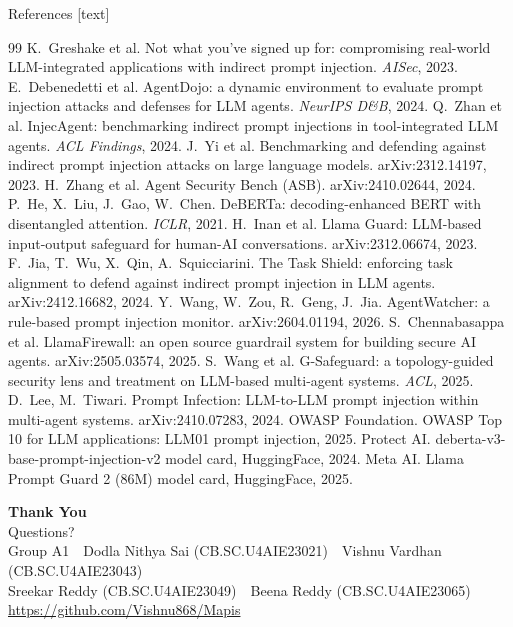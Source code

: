 \documentclass[aspectratio=169,10pt]{beamer}
\newcommand{\GroupName}{Group A1}
\newcommand{\MemberA}{Dodla Nithya Sai (CB.SC.U4AIE23021)}
\newcommand{\MemberB}{Vishnu Vardhan (CB.SC.U4AIE23043)}
\newcommand{\MemberC}{Sreekar Reddy (CB.SC.U4AIE23049)}
\newcommand{\MemberD}{Beena Reddy (CB.SC.U4AIE23065)}
\begin{document}
\begin{frame}{References}
    \scriptsize
    [text]
    \tiny
    \begin{thebibliography}{99}
       K.~Greshake et al. Not what you've signed up for: compromising real-world LLM-integrated applications with indirect prompt injection. \emph{AISec}, 2023.
       E.~Debenedetti et al. AgentDojo: a dynamic environment to evaluate prompt injection attacks and defenses for LLM agents. \emph{NeurIPS D\&B}, 2024.
       Q.~Zhan et al. InjecAgent: benchmarking indirect prompt injections in tool-integrated LLM agents. \emph{ACL Findings}, 2024.
       J.~Yi et al. Benchmarking and defending against indirect prompt injection attacks on large language models. arXiv:2312.14197, 2023.
       H.~Zhang et al. Agent Security Bench (ASB). arXiv:2410.02644, 2024.
       P.~He, X.~Liu, J.~Gao, W.~Chen. DeBERTa: decoding-enhanced BERT with disentangled attention. \emph{ICLR}, 2021.
       H.~Inan et al. Llama Guard: LLM-based input-output safeguard for human-AI conversations. arXiv:2312.06674, 2023.
       F.~Jia, T.~Wu, X.~Qin, A.~Squicciarini. The Task Shield: enforcing task alignment to defend against indirect prompt injection in LLM agents. arXiv:2412.16682, 2024.
       Y.~Wang, W.~Zou, R.~Geng, J.~Jia. AgentWatcher: a rule-based prompt injection monitor. arXiv:2604.01194, 2026.
       S.~Chennabasappa et al. LlamaFirewall: an open source guardrail system for building secure AI agents. arXiv:2505.03574, 2025.
       S.~Wang et al. G-Safeguard: a topology-guided security lens and treatment on LLM-based multi-agent systems. \emph{ACL}, 2025.
       D.~Lee, M.~Tiwari. Prompt Infection: LLM-to-LLM prompt injection within multi-agent systems. arXiv:2410.07283, 2024.
       OWASP Foundation. OWASP Top 10 for LLM applications: LLM01 prompt injection, 2025.
       Protect AI. deberta-v3-base-prompt-injection-v2 model card, HuggingFace, 2024.
       Meta AI. Llama Prompt Guard 2 (86M) model card, HuggingFace, 2025.
    \end{thebibliography}
\end{frame}

\begin{frame}[plain]
  \centering
  \vfill
  {\fontsize{54}{60}\selectfont\bfseries\color{red!60!black} Thank You}\\[8mm]
  {\Large Questions?}\\[10mm]
  {\small \GroupName\ \textbullet\ \MemberA\ \textbullet\ \MemberB\\ \MemberC\ \textbullet\ \MemberD}\\[2mm]
  {\footnotesize \url{https://github.com/Vishnu868/Mapis}}
  \vfill
\end{frame}
\end{document}
